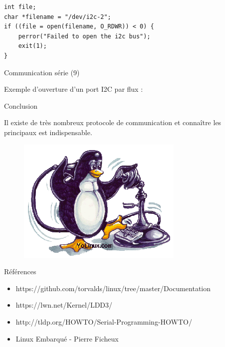 \documentclass[12pt, t]{beamer}
\newcommand{\bi}{\begin{itemize}}
\newcommand{\ei}{\end{itemize}}
\begin{document}
{
    \begin{lstlisting}
int file;
char *filename = "/dev/i2c-2";
if ((file = open(filename, O_RDWR)) < 0) {
    perror("Failed to open the i2c bus");
    exit(1);
}
    \end{lstlisting}
}
\begin{frame}{Communication série (9)}

    \vspace{20pt}
    Exemple d'ouverture d'un port I2C par flux :
    \vspace{10pt}
    \lstiicopen

\end{frame}

\begin{frame}{Conclusion}

    \centering
    \vspace{20pt}
    \LARGE{
        Il existe de très nombreux protocole de communication et connaître
        les principaux est indispensable.

        \begin{figure}
            \centering
            \includegraphics[scale=0.5]{socket.png}
        \end{figure}
    }

\end{frame}

\begin{frame}{Références}
    \vspace{30pt}

    \bi
    \itemsep12pt
    \item https://github.com/torvalds/linux/tree/master/Documentation
    \item https://lwn.net/Kernel/LDD3/
    \item http://tldp.org/HOWTO/Serial-Programming-HOWTO/
    \item Linux Embarqué - Pierre Ficheux
    \ei

\end{frame}
\end{document}
